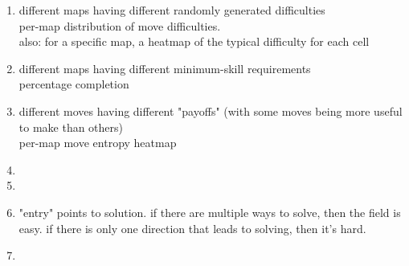         \begin{enumerate}
            \item different maps having different randomly generated difficulties \\
            per-map distribution of move difficulties. \\
            also: for a specific map, a heatmap of the typical difficulty for each cell
        
            \item different maps having different minimum-skill requirements \\
            percentage completion
            
            \item different moves having different "payoffs" (with some moves being more useful to make than others) \\
            per-map move entropy heatmap
        
            \item {}
            
            \item {}
            
            \item "entry" points to solution. if there are multiple ways to solve, then the field is easy. if there is only one direction that leads to solving, then it's hard. 
            
            \item {}
        \end{enumerate}
    
